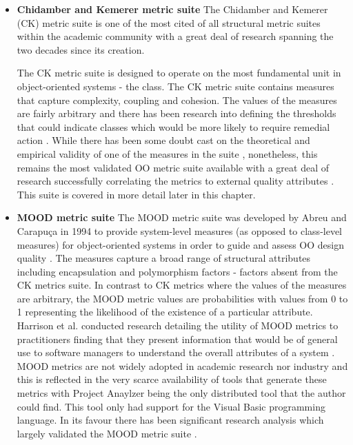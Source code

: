 \begin{itemize}
\item \textbf{Chidamber and Kemerer metric suite} The Chidamber and Kemerer (CK) metric suite is one of the most cited of all structural metric suites within the academic community \citep{pressman2005software} with a great deal of research spanning the two decades since its creation. 

The CK metric suite is designed to operate on the most fundamental unit in object-oriented systems - the class. The CK metric suite contains measures that capture complexity, coupling and cohesion. The values of the measures are fairly arbitrary and there has been research into defining the thresholds that could indicate classes which would be more likely to require remedial action \citep{rosenberg1998applying}. While there has been some doubt cast on the theoretical and empirical validity of one of the measures in the suite \citep{fenton2014software}, nonetheless, this remains the most validated OO metric suite available \citep{kitchenham2010s} with a great deal of research successfully correlating the metrics to external quality attributes \citep{rosenberg1998applying, el2001prediction, basili1984software, subramanyam2003empirical}. This suite is covered in more detail later in this chapter.

\item \textbf{MOOD metric suite} The MOOD metric suite was developed by Abreu and Carapu\c{c}a in 1994 to provide system-level measures (as opposed to class-level measures) for object-oriented systems in order to guide and assess OO design quality \citep{abreu1994object}. The measures capture a broad range of structural attributes including encapsulation and polymorphism factors - factors absent from the CK metrics suite. In contrast to CK metrics where the values of the measures are arbitrary, the MOOD metric values are probabilities with values from 0 to 1 representing the likelihood of the existence of a particular attribute. Harrison et al. conducted research detailing the utility of MOOD metrics to practitioners finding that they present information that would be of general use to software managers to understand the overall attributes of a system \citep{harrison1998investigation}. MOOD metrics are not widely adopted in academic research nor industry and this is reflected in the very scarce availability of tools that generate these metrics with Project Anaylzer \citep{abounader1997data} being the only distributed tool that the author could find. This tool only had support for the Visual Basic programming language. In its favour there has been significant research analysis which largely validated the MOOD metric suite \citep{abounader1997data, harrison1998evaluation}.


\end{itemize}
